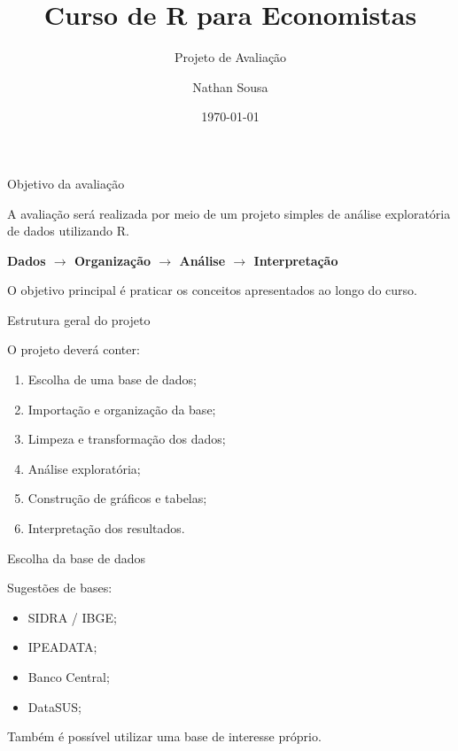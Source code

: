 \documentclass[11pt]{beamer}
\author{Nathan Sousa}
\title{Curso de R para Economistas}
\subtitle{Projeto de Avaliação}
\institute{gECo lab \\ UAEF-UFCG}
\date{\today}
\begin{document}
	
	\begin{frame}
		\titlepage
	\end{frame}
	
	\begin{frame}{Objetivo da avaliação}
		
		A avaliação será realizada por meio de um projeto simples de análise exploratória de dados utilizando R.
		
		\vspace{0.4cm}
		
		\begin{center}
			\textbf{Dados $\rightarrow$ Organização $\rightarrow$ Análise $\rightarrow$ Interpretação}
		\end{center}
		
		\vspace{0.4cm}
		
		O objetivo principal é praticar os conceitos apresentados ao longo do curso.
		
	\end{frame}
	
	\begin{frame}{Estrutura geral do projeto}
		
		O projeto deverá conter:
		
		\begin{enumerate}
			\item Escolha de uma base de dados;
			\item Importação e organização da base;
			\item Limpeza e transformação dos dados;
			\item Análise exploratória;
			\item Construção de gráficos e tabelas;
			\item Interpretação dos resultados.
		\end{enumerate}
		
	\end{frame}
	
	\begin{frame}{Escolha da base de dados}
		
		Sugestões de bases:
		
		\begin{itemize}
			\item SIDRA / IBGE;
			\item IPEADATA;
			\item Banco Central;
			\item DataSUS;
		\end{itemize}
		
		\vspace{0.4cm}
		
		Também é possível utilizar uma base de interesse próprio.
		
	\end{frame}
	
\end{document}
